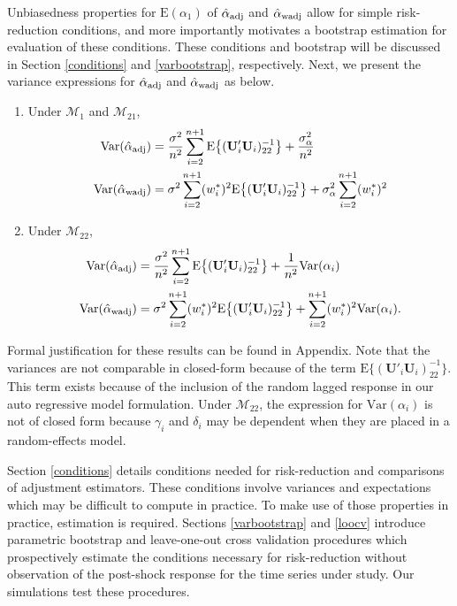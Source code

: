 \documentclass[11pt]{article}
\def\mbf#1{\mathbf{#1}} %
\def\mrm#1{\mathrm{#1}} %
\def\mc#1{\mathcal{#1}} %
\def\E#1{\mathrm{E}(#1)} %
\def\var#1{\mathrm{Var}(#1)} %
\theoremstyle{definition}
\begin{document}
Unbiasedness properties for $\E{\alpha_1}$ of $\hat{\alpha}_{\rm adj}$ and $\hat{\alpha}_{\rm wadj}$ allow for simple risk-reduction conditions, and more importantly motivates a bootstrap estimation for evaluation of these conditions. %
These conditions and bootstrap will be discussed in Section \ref{conditions} and \ref{varbootstrap}, respectively. Next, we present the variance expressions for $\hat{\alpha}_{\rm adj}$ and $\hat{\alpha}_{\rm wadj}$ as below.

\begin{enumerate}[label = (\roman*)]
  \item Under $\mc{M}_1$ and $\mc{M}_{21}$,  
\begin{align*}
  \var{\hat{\alpha}_{\rm adj}} 
  &=\frac{\sigma^2}{n^2}\sum_{i=2}^{n+1}\mrm{E}\big\{(\mbf{U}'_i\mbf{U}_i)^{-1}_{22}\big\}+\frac{\sigma^2_{\alpha}}{n^2}\\
\var{\hat{\alpha}_{\rm wadj}}  &= \sigma^2\sum_{i=2}^{n+1}(w_i^*)^2\mrm{E}\big\{(\mbf{U}'_i\mbf{U}_i)^{-1}_{22}\big\}+\sigma^2_{\alpha}\sum_{i=2}^{n+1}(w_i^*)^2
\end{align*}
\item Under $\mc{M}_{22}$, 
\begin{align*}
\var{\hat{\alpha}_{\rm adj}} 
  &=\frac{\sigma^2}{n^2}\sum_{i=2}^{n+1}\mrm{E}\big\{(\mbf{U}'_i\mbf{U}_i)^{-1}_{22}\big\}+\frac{1}{n^2}\var{\alpha_i}\\
  \var{\hat{\alpha}_{\rm wadj}} 
  &= \sigma^2\sum_{i=2}^{n+1}(w_i^*)^2\mrm{E}\big\{(\mbf{U}'_i\mbf{U}_i)^{-1}_{22}\big\}
  + \sum_{i=2}^{n+1} (w_i^*)^2 \var{\alpha_i}.
\end{align*}
\end{enumerate}
Formal justification for these results can be found in Appendix. Note that the variances are not comparable in closed-form %
because of the term $\mrm{E}\big\{(\mbf{U}'_i\mbf{U}_i)^{-1}_{22}\big\}$.  This term exists because of the inclusion of the random lagged response in our auto regressive model formulation.  Under $\mc{M}_{22}$, the expression for $\var{\alpha_i}$ is not of closed form because $\gamma_i$ and $\delta_i$ may be dependent when they are placed in a random-effects model.  



Section \ref{conditions} details conditions needed for risk-reduction and comparisons of adjustment estimators. These conditions involve variances and expectations which may be difficult to compute in practice. To make use of those properties in practice, estimation is required. Sections \ref{varbootstrap} and \ref{loocv} introduce  parametric bootstrap and leave-one-out cross validation procedures which prospectively estimate the conditions necessary for risk-reduction without observation of the post-shock response for the time series under study. Our simulations test these procedures. 
\end{document}
